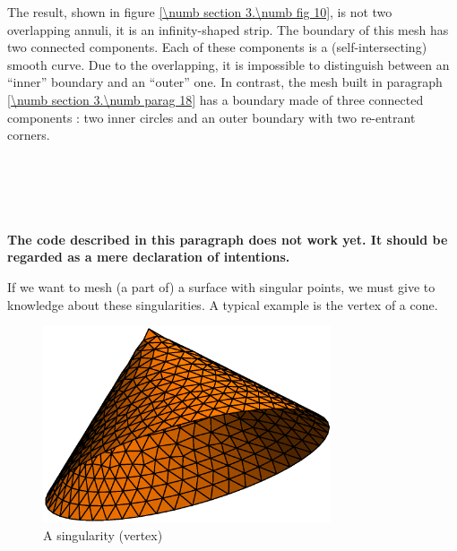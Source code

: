 The result, shown in figure \ref{\numb section 3.\numb fig 10},
is not two overlapping annuli, it is an infinity-shaped strip.
The boundary of this mesh has two connected components.
Each of these components is a (self-intersecting) smooth curve.
Due to the overlapping, it is impossible to distinguish between an ``inner'' boundary
and an ``outer'' one.
In contrast, the mesh built in paragraph \ref{\numb section 3.\numb parag 18}
has a boundary made of three connected components : two inner circles
and an outer boundary with two re-entrant corners.


\section{~~}\label{\numb section 3.\numb parag 22}

{\normalfont\bfseries The code described in this paragraph does not work yet.
It should be regarded as a mere declaration of intentions.}
\medskip

If we want to mesh (a part of) a surface with singular points, we must give to {\maniFEM}
knowledge about these singularities.
A typical example is the vertex of a cone.

\begin{figure}[ht] \centering
 \includegraphics[width=85mm]{cone}
  \caption{A singularity (vertex)}
  \label{\numb section 3.\numb fig 11}
\end{figure}

